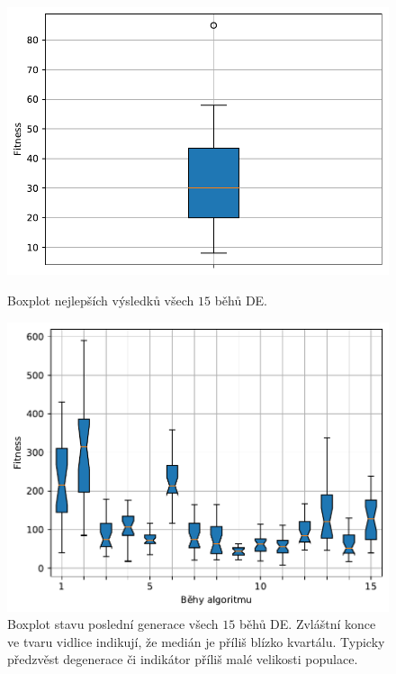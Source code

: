 \begin{figure}[H]
\begin{minipage}[t]{0.475\linewidth}
\includegraphics[width=\linewidth]{obrazky-figures/statistics/HIFU/blob/4/DE/bestsBoxplot_WithOutliers.pdf}
\caption{Boxplot nejlepších výsledků všech $15$ běhů DE.}
\label{fg:hifu:de:best}
\end{minipage}
\hfill
\begin{minipage}[t]{0.475\linewidth}
\includegraphics[width=\linewidth]{obrazky-figures/statistics/HIFU/blob/4/DE/lastGenBoxplots.pdf}
\caption{Boxplot stavu poslední generace všech $15$ běhů DE. Zvláštní konce ve tvaru vidlice indikují, že medián je příliš blízko kvartálu. Typicky předzvěst degenerace či indikátor příliš malé velikosti populace. }
\label{fg:hifu:de:lastGen}
\end{minipage}
\end{figure}


